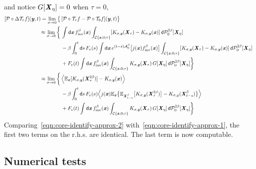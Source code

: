 \documentclass[aip,jcp,a4paper,reprint,onecolumn]{revtex4-1}
\newcommand{\vect}[1]{\textbf{\textit{#1}}}
\newcommand{\dd}{\textsf{d}}
\newcommand{\inv}{\textrm{inv}}
\newcommand{\mh}{\mathcal H}
\newcommand{\mt}{\mathcal T}
\newcommand{\mc}{\mathcal C}
\newcommand{\fwg}{{\mathcal A}}
\begin{document}
and notice $G[\vect X_\eta] = 0$ when $\tau = 0$,
\begin{align}\nonumber
  [\mathcal P\circ\Delta\mt_\tau f](\vect y, t)
  =
  \lim_{\sigma \rightarrow 0}
  \big\{
  &\,
  [\mathcal P\circ\mt_\tau f - \mathcal P\circ\mt_0 f](\vect y, t)
  \big\}\\\nonumber
  \approx
  \lim_{\sigma \rightarrow 0}
  \bigg\{
  &\,
  \int \dd \vect x\,
  f_\inv^\beta(\vect x)
  \int_{\mc\{\vect x,0;\tau\}}
  [K_{\sigma,\vect y}(\vect X_\tau)
  -K_{\sigma,\vect y}(\vect x)]  \,
  \dd \mathcal P^{2\beta}_0[\vect X_\eta]\\\nonumber
  &\,-
  \beta
  \int_0^t\dd s\, F_e(s)
  \int \dd \vect x\,
  e^{(t-s)\fwg_0^\beta}
  \big[
  j(\vect x)
  f_\inv^\beta(\vect x)
  \big]
  \int_{\mc\{\vect x,0;\tau\}}
  [K_{\sigma,\vect y}(\vect X_\tau)
  -K_{\sigma,\vect y}(\vect x)]  \,
  \dd \mathcal P^{2\beta}_0[\vect X_\eta]\\\nonumber
  &\,+
  F_e(t)
  \int \dd \vect x\,
  f_\inv^\beta(\vect x)
  \int_{\mc\{\vect x,0;\tau\}}
  K_{\sigma,\vect y}(\vect X_\tau)
  \,G[\vect X_\eta]\,
  \dd \mathcal P^{2\beta}_0[\vect X_\eta]
  \bigg\}\\\nonumber
  \approx
  \lim_{\sigma \rightarrow 0}
  \bigg\{
  &\,
  \Big\langle
  \mathbb E_{\vect x}[K_{\sigma,\vect y}(\vect X_\tau^{2\beta})]
  -
  K_{\sigma,\vect y}(\vect x)
  \Big\rangle\\\nonumber
  &\,
  - \beta
  \int_0^t\dd s\, F_e(s)
  \Big\langle
  j(\vect x)
  \mathbb E_{\vect x} \big\{
  \mathbb E_{\vect X^\beta_{t-s}}\big[
  K_{\sigma, \vect y}(\vect X^{2\beta}_\tau)
  \big]
  -
  K_{\sigma, y}(\vect X^\beta_{t-s})
  \big\}
  \Big\rangle\\\label{eqn:core-identify-approx-2}
  &\,+
  F_e(t)
  \int \dd \vect x\,
  f_\inv^\beta(\vect x)
  \int_{\mc\{\vect x,0;\tau\}}
  K_{\sigma,\vect y}(\vect X_\tau)
  \,G[\vect X_\eta]\,
  \dd \mathcal P^{2\beta}_0[\vect X_\eta]
  \bigg\}
\end{align}
Comparing~\eqref{eqn:core-identify-approx-2}
with~\eqref{eqn:core-identify-approx-1}, the first
two terms on the r.h.s. are identical. 
The last term is now computable.






\subsection{Numerical tests}
\end{document}
